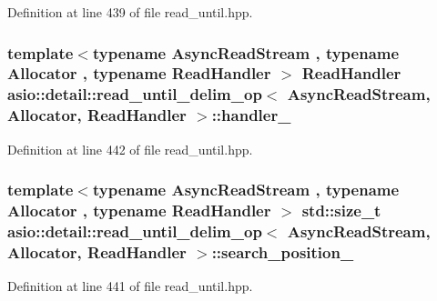 Definition at line 439 of file read\+\_\+until.\+hpp.

\hypertarget{classasio_1_1detail_1_1read__until__delim__op_a4adc13e1e6271a6f531363401e515b54}{}
\subsubsection[{handler\+\_\+}]{\setlength{\rightskip}{0pt plus 5cm}template$<$typename Async\+Read\+Stream , typename Allocator , typename Read\+Handler $>$ Read\+Handler {\bf asio\+::detail\+::read\+\_\+until\+\_\+delim\+\_\+op}$<$ Async\+Read\+Stream, Allocator, Read\+Handler $>$\+::handler\+\_\+}\label{classasio_1_1detail_1_1read__until__delim__op_a4adc13e1e6271a6f531363401e515b54}


Definition at line 442 of file read\+\_\+until.\+hpp.

\hypertarget{classasio_1_1detail_1_1read__until__delim__op_aecea70ef337b9f61459c1671618aed95}{}
\subsubsection[{search\+\_\+position\+\_\+}]{\setlength{\rightskip}{0pt plus 5cm}template$<$typename Async\+Read\+Stream , typename Allocator , typename Read\+Handler $>$ std\+::size\+\_\+t {\bf asio\+::detail\+::read\+\_\+until\+\_\+delim\+\_\+op}$<$ Async\+Read\+Stream, Allocator, Read\+Handler $>$\+::search\+\_\+position\+\_\+}\label{classasio_1_1detail_1_1read__until__delim__op_aecea70ef337b9f61459c1671618aed95}


Definition at line 441 of file read\+\_\+until.\+hpp.

\hypertarget{classasio_1_1detail_1_1read__until__delim__op_a75f7ed240fb758a37f0893150aea7fd1}{}
